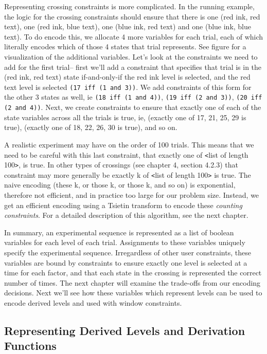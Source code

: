 Representing crossing constraints is more complicated. In the running example, the logic for the crossing constraints should ensure that there is one (red ink, red text), one (red ink, blue text), one (blue ink, red text) and one (blue ink, blue text). To do encode this, we allocate 4 more variables for each trial, each of which literally encodes which of those 4 states that trial represents. See figure  for a visualization of the additional variables. Let's look at the constraints we need to add for the first trial-- first we'll add a constraint that specifies that trial is in the (red ink, red text) state if-and-only-if the red ink level is selected, and the red text level is selected \texttt{(17 iff (1 and 3))}. We add constraints of this form for the other 3 states as well, ie \texttt{(18 iff (1 and 4))}, \texttt{(19 iff (2 and 3))}, \texttt{(20 iff (2 and 4))}. Next, we create constraints to ensure that exactly one of each of the state variables across all the trials is true, ie, (exactly one of 17, 21, 25, 29 is true), (exactly one of 18, 22, 26, 30 is true), and so on.

A realistic experiment may have on the order of 100 trials. This means that we need to be careful with this last constraint, that exactly one of \texttt{<}list of length 100\texttt{>}, is true. In other types of crossings (see chapter 4, section 4.2.3) that constraint may more generally be exactly k of \texttt{<}list of length 100\texttt{>} is true. The naive encoding (these k, or those k, or those k, and so on) is exponential, therefore not efficient, and in practice too large for our problem size. Instead, we get an efficient encoding using a Tsietin transform to encode these \emph{counting constraints}. For a detailed description of this algorithm, see the next chapter.

In summary, an experimental sequence is represented as a list of boolean variables for each level of each trial. Assignments to these variables uniquely specify the experimental sequence. Irregardless of other user constraints, these variables are bound by constraints to ensure exactly one level is selected at a time for each factor, and that each state in the crossing is represented the correct number of times. The next chapter will examine the trade-offs from our encoding decisions. Next we'll see how these variables which represent levels can be used to encode derived levels and used with window constraints.

\subsection{Representing Derived Levels and Derivation Functions}

